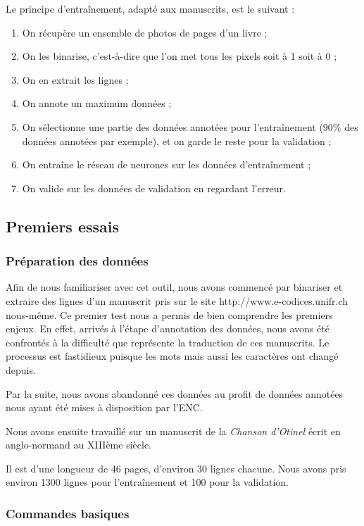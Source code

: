 \documentclass{article}
\begin{document}
Le principe d'entraînement, adapté aux manuscrits, est le suivant : 
\begin{enumerate}[parsep=0.1cm,itemsep=0.1cm,topsep=0.1cm]
    \item On récupère un ensemble de photos de pages d'un livre ;
    \item On les binarise, c'est-à-dire que l'on met tous les pixels soit à 1 soit à 0 ;
    \item On en extrait les lignes ;
    \item On annote un maximum données ;
    \item On sélectionne une partie des données annotées pour l'entraînement (90\% des données annotées par exemple), et on garde le reste pour la validation ;
    \item On entraîne le réseau de neurones sur les données d'entraînement ;
    \item On valide sur les données de validation en regardant l'erreur.
\end{enumerate}

\subsection{Premiers essais}

\subsubsection{Préparation des données}

Afin de nous familiariser avec cet outil, nous avons commencé par binariser et extraire des lignes d'un manuscrit pris sur le site http://www.e-codices.unifr.ch nous-même. Ce premier test nous a permis de bien comprendre les premiers enjeux. En effet, arrivés à l'étape d'annotation des données, nous avons été confrontés à la difficulté que représente la traduction de ces manuscrits. Le processus est fastidieux puisque les mots mais aussi les caractères ont changé depuis.

Par la suite, nous avons abandonné ces données au profit de données annotées nous ayant été mises à disposition par l'ENC.

Nous avons ensuite travaillé sur un manuscrit de la \textit{Chanson d'Otinel} écrit en anglo-normand au XIIIème siècle.

Il est d'une longueur de 46 pages, d'environ 30 lignes chacune. Nous avons pris environ 1300 lignes pour l'entraînement et 100 pour la validation.

\subsubsection{Commandes basiques}
\end{document}
